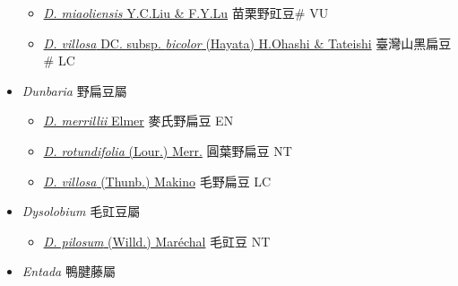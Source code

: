 \begin{itemize}
  \begin{itemize}
        \item[] \href{http://www.theplantlist.org/tpl1.1/search?q=Dumasia+miaoliensis}{\textit{D. miaoliensis} Y.C.Liu \& F.Y.Lu}   苗栗野豇豆\# VU
        \item[] \href{http://www.theplantlist.org/tpl1.1/search?q=Dumasia+villosa+subsp.+bicolor}{\textit{D. villosa} DC. subsp. \textit{bicolor} (Hayata) H.Ohashi \& Tateishi}   臺灣山黑扁豆\# LC
  \end{itemize}
 \item[] \textit{Dunbaria} 野扁豆屬
                    
  \begin{itemize}
        \item[] \href{http://www.theplantlist.org/tpl1.1/search?q=Dunbaria+merrillii}{\textit{D. merrillii} Elmer}   麥氏野扁豆 EN
        \item[] \href{http://www.theplantlist.org/tpl1.1/search?q=Dunbaria+rotundifolia}{\textit{D. rotundifolia} (Lour.) Merr.}   圓葉野扁豆 NT
        \item[] \href{http://www.theplantlist.org/tpl1.1/search?q=Dunbaria+villosa}{\textit{D. villosa} (Thunb.) Makino}   毛野扁豆 LC
  \end{itemize}
 \item[] \textit{Dysolobium} 毛豇豆屬
                    
  \begin{itemize}
        \item[] \href{http://www.theplantlist.org/tpl1.1/search?q=Dysolobium+pilosum}{\textit{D. pilosum} (Willd.) Maréchal}   毛豇豆 NT
  \end{itemize}
 \item[] \textit{Entada} 鴨腱藤屬
                    

\end{itemize}
